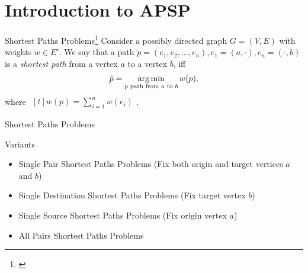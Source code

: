 \section{Introduction to APSP}

\begin{frame}{Shortest Paths Problems\footnote{\cite[Section~24]{Cormen2001}}}
    Consider a possibly directed graph $G = (V, E)$ with weights $w \in E'$.
    We say that a path $\tilde{p} = (e_1, e_2, \dots, e_n), e_1 = (a, \cdot), e_n = (\cdot, b)$ is a \emph{shortest path} from a vertex $a$ to a vertex $b$, iff
    \[
        \tilde{p} = \operatorname*{arg\,min}\limits_{p\text{ path from }a\text{ to }b} w(p),
    \]
    where $\begin{aligned}[t]w(p) = \sum\limits_{i = 1}^n w(e_i)\end{aligned}$.
\end{frame}

\begin{frame}{Shortest Paths Problems}
    \begin{alertblock}{Variants}
        \begin{itemize}
            \item<1-> Single Pair Shortest Paths Problems (Fix both origin and target vertices $a$ and $b$)
            \item<2-> Single Destination Shortest Paths Problems (Fix target vertex $b$)
            \item<3-> Single Source Shortest Paths Problems (Fix origin vertex $a$)
            \item<4-> All Pairs Shortest Paths Problems
        \end{itemize}
    \end{alertblock}
\end{frame}

